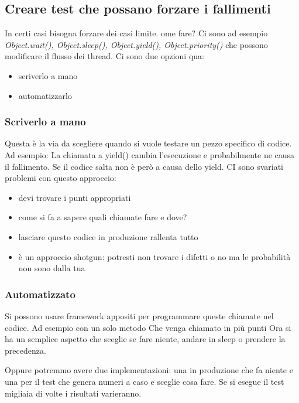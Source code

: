 \documentclass[11pt,a4paper]{book}
\begin{document}
\subsection{Creare test che possano forzare i fallimenti}
In certi casi bisogna forzare dei casi limite. ome fare? Ci sono ad esempio \emph{Object.wait(), Object.sleep(), Object.yield(), Object.priority()} che possono modificare il flusso dei thread. Ci sono due opzioni qua:
\begin{itemize}
	\item scriverlo a mano
	\item automatizzarlo
\end{itemize}

\subsubsection{Scriverlo a mano}
Questa è la via da scegliere quando si vuole testare un pezzo specifico di codice. Ad esempio:
\label{code: 063}
La chiamata a yield() cambia l'esecuzione e probabilmente ne causa il fallimento. Se il codice salta non è però a causa dello yield. CI sono svariati problemi con questo approccio:
\begin{itemize}
	\item devi trovare i punti appropriati
	\item come si fa a sapere quali chiamate fare e dove?
	\item lasciare questo codice in produzione rallenta tutto
	\item è un approccio shotgun: potresti non trovare i difetti o no ma le probabilità non sono dalla tua
\end{itemize}

\subsubsection{Automatizzato}
Si possono usare framework appositi per programmare queste chiamate nel codice. Ad esempio con un solo metodo
\label{code: 064}
Che venga chiamato in più punti
\label{code: 065}
Ora si ha un semplice aspetto che sceglie se fare niente, andare in sleep o prendere la precedenza.

Oppure potremmo avere due implementazioni: una in produzione che fa niente e una per il test che genera numeri a caso e sceglie cosa fare. Se si esegue il test migliaia di volte i risultati varieranno.
\end{document}
